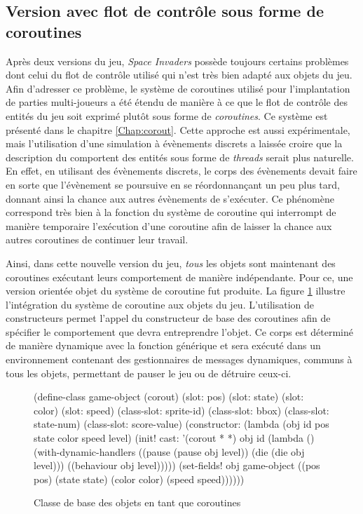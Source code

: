 \documentclass[12pt,twoside,letterpaper,francais]{book}
\newcommand{\scheme}[1]{\selectlanguage{english}{\tt #1}\selectlanguage{french}}
\begin{document}
\subsection{Version avec flot de contrôle sous forme de coroutines} \label{Exp:sp3}
Après deux versions du jeu, \textit{Space Invaders} possède toujours certains problèmes
dont celui du flot de contrôle utilisé qui n'est très bien adapté aux
objets du jeu. Afin d'adresser ce problème, le système de coroutines
utilisé pour l'implantation de parties multi-joueurs a été étendu de
manière à ce que le flot de contrôle des entités du jeu soit exprimé
plutôt sous forme de \emph{coroutines}. Ce système est présenté dans
le chapitre \ref{Chap:corout}. Cette approche est aussi expérimentale,
mais l'utilisation d'une simulation à évènements discrets a laissée
croire que la description du comportent des entités sous forme de
\textit{threads} serait plus naturelle. En effet, en utilisant des
évènements discrets, le corps des évènements devait faire en sorte que
l'évènement se poursuive en se réordonnançant un peu plus tard,
donnant ainsi la chance aux autres évènements de s'exécuter. Ce
phénomène correspond très bien à la fonction \scheme{yield} du système
de coroutine qui interrompt de manière temporaire l'exécution d'une
coroutine afin de laisser la chance aux autres coroutines de continuer
leur travail.

Ainsi, dans cette nouvelle version du jeu, \emph{tous} les objets sont
maintenant des coroutines exécutant leurs comportement de manière
indépendante. Pour ce, une version orientée objet du système de
coroutine fut produite. La figure \ref{Exp:si3-class} illustre
l'intégration du système de coroutine aux objets du jeu. L'utilisation
de constructeurs permet l'appel du constructeur de base des coroutines
afin de spécifier le comportement que devra entreprendre l'objet. Ce
corps est déterminé de manière dynamique avec la fonction générique
\scheme{behaviour} et sera exécuté dans un environnement contenant des
gestionnaires de messages dynamiques, communs à tous les objets,
permettant de pauser le jeu ou de détruire ceux-ci.\\

\begin{figure}[htb!]
  \begin{schemecode}
(define-class game-object (corout)
  (slot: pos)
  (slot: state)
  (slot: color)
  (slot: speed)
  (class-slot: sprite-id)
  (class-slot: bbox)
  (class-slot: state-num)
  (class-slot: score-value)
  (constructor: (lambda (obj id pos state color speed level)
                  (init! cast: '(corout * *) obj id
                         (lambda ()(with-dynamic-handlers
                                    ((pause (pause obj level))
                                     (die   (die   obj level)))
                                    ((behaviour obj level)))))
                  (set-fields! obj game-object
                    ((pos pos)     (state state)
                     (color color) (speed speed))))))
  \end{schemecode}
  \caption{Classe de base des objets en tant que coroutines}
  \label{Exp:si3-class}
\end{figure}
\end{document}
